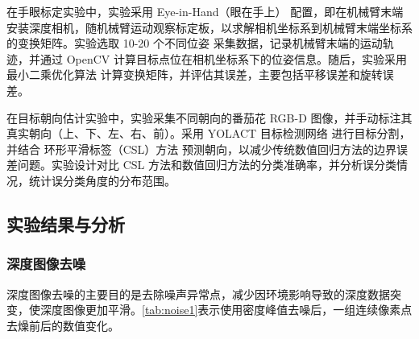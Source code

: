 在手眼标定实验中，实验采用 Eye-in-Hand（眼在手上） 配置，即在机械臂末端安装深度相机，随机械臂运动观察标定板，以求解相机坐标系到机械臂末端坐标系的变换矩阵。实验选取 10-20 个不同位姿 采集数据，记录机械臂末端的运动轨迹，并通过 OpenCV 计算目标点位在相机坐标系下的位姿信息。随后，实验采用最小二乘优化算法 计算变换矩阵，并评估其误差，主要包括平移误差和旋转误差。

在目标朝向估计实验中，实验采集不同朝向的番茄花 RGB-D 图像，并手动标注其真实朝向（上、下、左、右、前）。采用 YOLACT 目标检测网络 进行目标分割，并结合 环形平滑标签（CSL）方法 预测朝向，以减少传统数值回归方法的边界误差问题。实验设计对比 CSL 方法和数值回归方法的分类准确率，并分析误分类情况，统计误分类角度的分布范围。


\subsection{实验结果与分析}
\subsubsection{深度图像去噪}
\begin{table}[htbp]
	\caption[连续像素区域去噪前后数值对比]{连续像素区域去噪前后数值对比}
	\label{tab:noise1}
\end{table}
深度图像去噪的主要目的是去除噪声异常点，减少因环境影响导致的深度数据突变，使深度图像更加平滑。\cref{tab:noise1}表示使用密度峰值去噪后，一组连续像素点去燥前后的数值变化。

